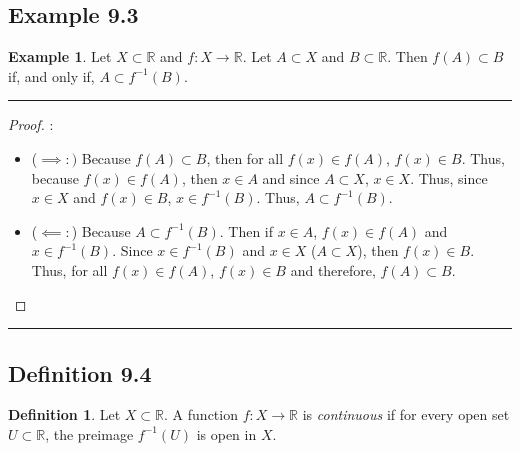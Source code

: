 \documentclass[openany, amssymb, psamsfonts]{amsart}
\newcommand{\bbR}{\mathbb{R}}
\newcommand{\arr}{\longrightarrow}
\theoremstyle{definition}
\newtheorem{defn}{Definition}[section]
\newtheorem{exmp}{Example}[section]
\numberwithin{equation}{section}
\begin{document}
\subsection*{Example 9.3}
\label{9.3}
\begin{exmp} Let $X\subset \bbR$ and $f:X\longrightarrow \bbR.$ Let $A\subset X$ and $B\subset \bbR.$ Then $f(A)\subset B$ if, and only if, $A \subset f^{-1}(B).$ 
\end{exmp} 
\vspace{4pt}     \hrule   \vspace{4pt}\begin{proof}:\\
\begin{itemize}
    \item ($\implies :)$ Because $f(A) \subset B$, then for all $f(x)\in f(A)$, $f(x)\in B$. Thus, because $f(x) \in f(A)$, then $x\in A$ and since $A\subset X$, $x\in X$. Thus, since $x\in X$ and $f(x) \in B$, $x\in f^{-1}(B)$. Thus, $A\subset f^{-1}(B)$.
    \item ($\impliedby:$) Because $A \subset f^{-1}(B)$. Then if $x\in A$, $f(x) \in f(A)$ and $x\in f^{-1}(B)$. Since $x\in f^{-1}(B)$ and $x\in X$ ($A\subset X$), then $f(x) \in B$. Thus, for all $f(x) \in f(A)$, $f(x) \in B$ and therefore, $f(A) \subset B$.
\end{itemize}
\end{proof} \vspace{4pt}     \hrule   \vspace{4pt}

\subsection*{Definition 9.4}
\begin{defn} \label{9.4} Let $X\subset \bbR$. A function $f \colon X \arr \bbR$ is \emph{continuous} if for every open set $U \subset \bbR$, the preimage $f^{-1}(U)$ is open in $X$.
\end{defn}
\end{document}
